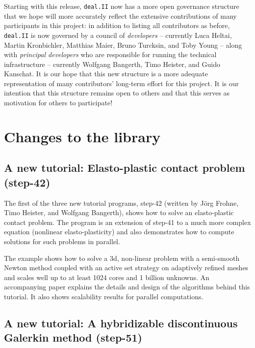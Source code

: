 \documentclass{siamltex}
\newcommand{\specialword}[1]{\texttt{#1}}
\newcommand{\dealii}{{\specialword{deal.II}}}
\begin{document}
Starting with this release, \dealii{} now has a more open governance structure
that we hope will more accurately reflect the extensive contributions of many
participants in this project: in addition to listing all contributors as
before, \dealii{} is now governed by a council of \textit{developers} --
currently Luca Heltai, Martin Kronbichler, Matthias Maier, Bruno Turcksin, and
Toby Young -- along with \textit{principal developers} who are responsible for
running the technical infrastructure -- currently Wolfgang
Bangerth, Timo Heister, and Guido Kanschat. It is our hope that this new
structure is a more adequate representation of many contributors' long-term
effort for this project. It is our intention that this structure remains open
to others and that this serves as motivation for others to participate!

\section{Changes to the library}

\subsection{A new tutorial: Elasto-plastic contact problem (step-42)}
\label{sec:step42}

The first of the three new tutorial programs, step-42 (written by Jörg Frohne,
Timo Heister, and Wolfgang Bangerth), shows how to solve an elasto-plastic
contact problem. The program is an extension of step-41 to a much more complex
equation (nonlinear elasto-plasticity) and also demonstrates how to compute
solutions for such problems in parallel.

The example shows how to solve a 3d, non-linear problem with a semi-smooth
Newton method coupled with an active set strategy on adaptively refined meshes
and scales well up to at least 1024 cores and 1 billion unknowns. An
accompanying paper \cite{FHB13} explains the details and design of the
algorithms behind this tutorial. It also shows scalability results for
parallel computations.

\subsection{A new tutorial: A hybridizable discontinuous Galerkin method (step-51)}
\label{sec:step51}
\end{document}
